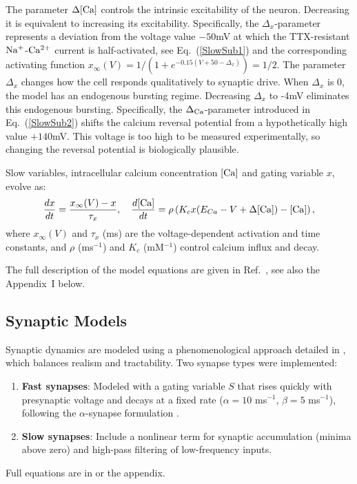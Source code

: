 \documentclass[nofootinbib,aip,amsmath,amssymb,reprint,twocolumn,10pt]{revtex4-2}
\begin{document}
The parameter $\Delta { [\rm Ca]}$ controls the intrinsic excitability of the neuron. Decreasing it is equivalent to increasing its excitability. Specifically, the $\Delta_x$-parameter represents a deviation from the voltage value $-50$mV at which the TTX-resistant $\rm Na^{+}$-$\rm Ca^{2+}$ current is half-activated, see   Eq.~(\ref{SlowSub1}) and the corresponding activating function $x_{\infty}(V)=1/ \left (1+e^{-0.15(V+50-\Delta_{x})} \right )=1/2$. 
The parameter $\Delta _{x}$ changes how the cell responds qualitatively to synaptic drive. When $\Delta _{x}$ is 0, the model has an endogenous bursting regime. Decreasing $\Delta _{x}$ to -4mV eliminates this endogenous bursting. Specifically, the $\Delta_{\rm Ca}$-parameter  introduced in Eq.~(\ref{SlowSub2}) shifts the calcium reversal potential from a hypothetically high value $+140$mV. This voltage is too high to be measured experimentally, so changing the reversal potential is biologically plausible.





Slow variables, intracellular calcium concentration $[\rm Ca]$ and gating variable $x$, evolve as:
\begin{equation}
\frac{dx}{dt} = \frac{x_\infty(V) - x}{\tau_x},\quad 
\frac{d[\rm Ca]}{dt} = \rho \left( K_c x (E_{Ca} - V + \Delta { [\rm Ca]}) - [\rm Ca] \right),
\end{equation}
where $x_\infty(V)$ and $\tau_x$ (ms) are the voltage-dependent activation and time constants, and $\rho$ (ms$^{-1}$) and $K_c$ (mM$^{-1}$) control calcium influx and decay.




The full description of the model equations are given in Ref.~\cite{scully2024pairing}, see also the Appendix~I below.


\subsection*{Synaptic Models}

Synaptic dynamics are modeled using a phenomenological approach detailed in \cite{scully2024pairing}, which balances realism and tractability.
Two synapse types were implemented:
\begin{enumerate}
    \item \textbf{Fast synapses}: Modeled with a gating variable $S$ that rises quickly with presynaptic voltage and decays at a fixed rate ($\alpha = 10$ ms$^{-1}$, $\beta = 5$ ms$^{-1}$), following the $\alpha$-synapse formulation \cite{destexhe1994synthesis}.
    \item \textbf{Slow synapses}: Include a nonlinear term for synaptic accumulation (minima above zero) and high-pass filtering of low-frequency inputs.
\end{enumerate}
Full equations are in \cite{scully2024pairing} or the appendix.
\end{document}
